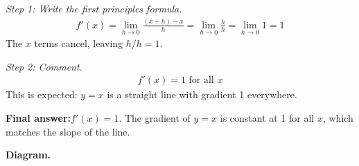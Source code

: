 \documentclass[11pt]{article}
\begin{document}
\textit{Step 1: Write the first principles formula.}
\[\begin{gathered}
f'(x) = \lim_{h \to 0} \frac{(x+h) - x}{h} = \lim_{h \to 0} \frac{h}{h} = \lim_{h \to 0} 1 = 1
\end{gathered}\]
The \( x \) terms cancel, leaving \( h/h = 1 \).

\textit{Step 2: Comment.}
\[\begin{gathered}
f'(x) = 1 \text{ for all } x
\end{gathered}\]
This is expected: \( y = x \) is a straight line with gradient 1 everywhere.

\begin{answerbox}
\textbf{Final answer:}\quad \(\displaystyle  f'(x) = 1 \). The gradient of \(\displaystyle  y = x \) is constant at 1 for all \(\displaystyle  x \), which matches the slope of the line.
\end{answerbox}
\textbf{Diagram.}
\end{document}
